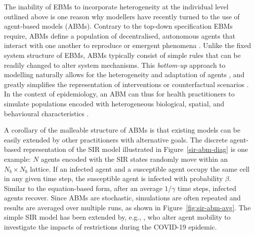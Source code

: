 The inability of EBMs to incorporate heterogeneity at the individual level outlined above is one reason why modellers have recently turned to the use of agent-based models (ABMs). Contrary to the top-down specification EBMs require, ABMs define a population of decentralised, autonomous agents that interact with one another to reproduce or  emergent phenomena \cite{epstein_growing_1996}. Unlike the fixed system structure of EBMs, ABMs typically consist of simple rules that can be readily changed to alter system mechanisms. This \textit{bottom-up} approach to modelling naturally allows for the heterogeneity and adaptation of agents \cite{axtell_agent-based_2022}, and greatly simplifies the representation of interventions or counterfactual scenarios \cite{van_dyke_parunak_agent-based_1998}. In the context of epidemiology, an ABM can thus  for health practitioners to simulate populations encoded with heterogeneous biological, spatial, and behavioural characteristics \cite{marshall_formalizing_2015}.

A corollary of the malleable structure of ABMs is that existing models can be easily extended by other practitioners with alternative goals. The discrete agent-based representation of the SIR model illustrated in Figure~\ref{sir-abm-diag} is one example: $N$ agents encoded with the SIR states randomly move within an $N_b\times N_b$ lattice. If an infected agent and a susceptible agent occupy the same cell in any given time step, the susceptible agent is infected with probability $\beta$. Similar to the equation-based form, after an average $1/\gamma$ time steps, infected agents recover. Since ABMs are stochastic, simulations are often repeated and results are averaged over multiple runs, as shown in Figure~\ref{fig:sir-abm-avg}. The simple SIR model has been extended by, e.g., \citet{paoluzzi_single-agent_2021}, who alter agent mobility to investigate the impacts of restrictions during the COVID-19 epidemic.






